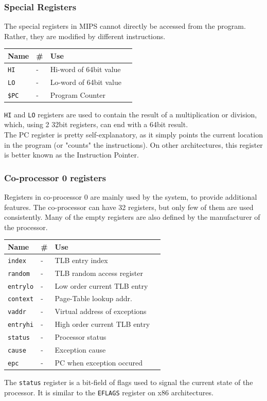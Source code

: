 \subsubsection{Special Registers}
The special registers in MIPS cannot directly be accessed from the program.
Rather, they are modified by different instructions.
\begin{center}
    \begin{tabular}{ | l | l | l | c |}
    \hline
	\textbf{Name} & \textbf{\#} & \textbf{Use} \\ \hline \hline
	\texttt{HI}		& - 	& Hi-word of 64bit value \\ \hline
	\texttt{LO}		& - 	& Lo-word of 64bit value \\ \hline
	\texttt{\$PC}		& - 	& Program Counter \\ \hline
    \end{tabular}
\end{center}
\texttt{HI} and \texttt{LO} registers are used to contain the result of a
multiplication or division, which, using 2 32bit registers, can end with a
64bit result.\\
The PC register is pretty self-explanatory, as it simply points the current
location in the program (or "counts" the instructions). On other architectures,
this register is better known as the Instruction Pointer.

\subsubsection{Co-processor 0 registers}
Registers in co-processor 0 are mainly used by the system, to provide
additional features. The co-processor can have 32 registers, but only few of
them are used consistently. Many of the empty registers are also defined by the
manufacturer of the processor.
\begin{center}
    \begin{tabular}{ | l | l | l | c |}
    \hline
	\textbf{Name} & \textbf{\#} & \textbf{Use} \\ \hline \hline
	\texttt{index}		& - 	& TLB entry index\\ \hline
	\texttt{random}		& - 	& TLB random access register \\ \hline
	\texttt{entrylo}	& - 	& Low order current TLB entry \\ \hline
	\texttt{context}	& - 	& Page-Table lookup addr. \\ \hline
	\texttt{vaddr}		& - 	& Virtual address of exceptions \\ \hline
	\texttt{entryhi}	& - 	& High order current TLB entry\\ \hline
	\texttt{status}		& - 	& Processor status \\ \hline
	\texttt{cause}		& - 	& Exception cause \\ \hline
	\texttt{epc}		& - 	& PC when exception occured \\ \hline
    \end{tabular}
\end{center}
The \texttt{status} register is a bit-field of flags used to signal the current
state of the processor. It is similar to the \texttt{EFLAGS} register on
x86 architectures.


